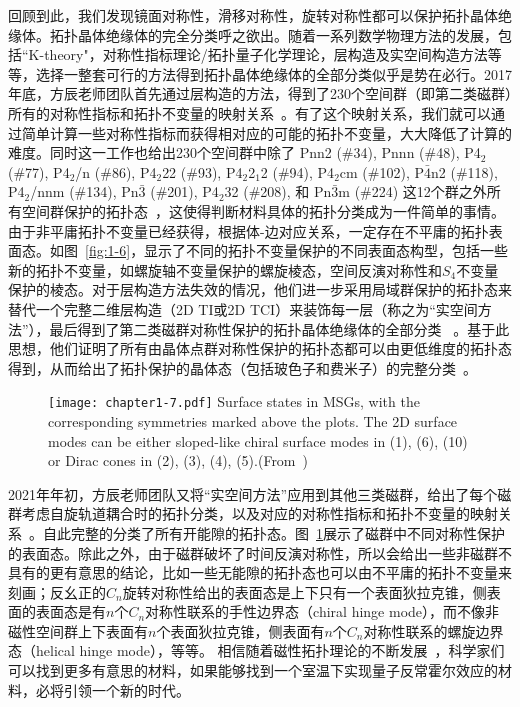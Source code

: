 回顾到此，我们发现镜面对称性，滑移对称性，旋转对称性都可以保护拓扑晶体绝缘体。拓扑晶体绝缘体的完全分类呼之欲出。随着一系列数学物理方法的发展，包括``K-theory"，对称性指标理论/拓扑量子化学理论，层构造及实空间构造方法等等，选择一整套可行的方法得到拓扑晶体绝缘体的全部分类似乎是势在必行。2017年底，方辰老师团队首先通过层构造的方法，得到了230个空间群（即第二类磁群）所有的对称性指标和拓扑不变量的映射关系~\citep{song2017}。有了这个映射关系，我们就可以通过简单计算一些对称性指标而获得相对应的可能的拓扑不变量，大大降低了计算的难度。同时这一工作也给出230个空间群中除了
Pnn2 (\#34), Pnnn (\#48), P4$_2$ (\#77), P4$_2$/n (\#86), P4$_2$22 (\#93), P4$_2$2$_1$2 (\#94), P4$_2$cm (\#102), P$\bar 4$n2 (\#118), P4$_2$/nnm (\#134), Pn$\bar 3$ (\#201), P4$_2$32 (\#208), 和 Pn$\bar 3$m (\#224)
这12个群之外所有空间群保护的拓扑态~\citep{song2017,Song2019}，这使得判断材料具体的拓扑分类成为一件简单的事情。由于非平庸拓扑不变量已经获得，根据体-边对应关系，一定存在不平庸的拓扑表面态。如图~\ref{fig:1-6}，显示了不同的拓扑不变量保护的不同表面态构型，包括一些新的拓扑不变量，如螺旋轴不变量保护的螺旋棱态，空间反演对称性和$S_4$不变量保护的棱态。对于层构造方法失效的情况，他们进一步采用局域群保护的拓扑态来替代一个完整二维层构造（2D TI或2D TCI）来装饰每一层（称之为“实空间方法”），最后得到了第二类磁群对称性保护的拓扑晶体绝缘体的全部分类 ~\citep{Song2019}。基于此思想，他们证明了所有由晶体点群对称性保护的拓扑态都可以由更低维度的拓扑态得到，从而给出了拓扑保护的晶体态（包括玻色子和费米子）的完整分类~\citep{Songreal}。
\begin{figure}[!htbp]
    \centering
    \texttt{[image: chapter1-7.pdf]}
    { Surface states in MSGs, with the corresponding symmetries marked above the plots. The 2D surface modes can be either sloped-like chiral surface modes in (1), (6), (10) or Dirac cones in (2), (3), (4), (5).(From~\citep{Peng2021})}
    \label{fig:1-7}
\end{figure}

2021年年初，方辰老师团队又将“实空间方法”应用到其他三类磁群，给出了每个磁群考虑自旋轨道耦合时的拓扑分类，以及对应的对称性指标和拓扑不变量的映射关系~\citep{Peng2021}。自此完整的分类了所有开能隙的拓扑态。图~\ref{fig:1-7}展示了磁群中不同对称性保护的表面态。除此之外，由于磁群破坏了时间反演对称性，所以会给出一些非磁群不具有的更有意思的结论，比如一些无能隙的拓扑态也可以由不平庸的拓扑不变量来刻画；反幺正的$C_n$旋转对称性给出的表面态是上下只有一个表面狄拉克锥，侧表面的表面态是有$n$个$C_n$对称性联系的手性边界态（chiral hinge mode），而不像非磁性空间群上下表面有$n$个表面狄拉克锥，侧表面有$n$个$C_n$对称性联系的螺旋边界态（helical hinge mode），等等。
相信随着磁性拓扑理论的不断发展~\citep{Elcoro2020,Peng2021}，科学家们可以找到更多有意思的材料，如果能够找到一个室温下实现量子反常霍尔效应的材料，必将引领一个新的时代。

